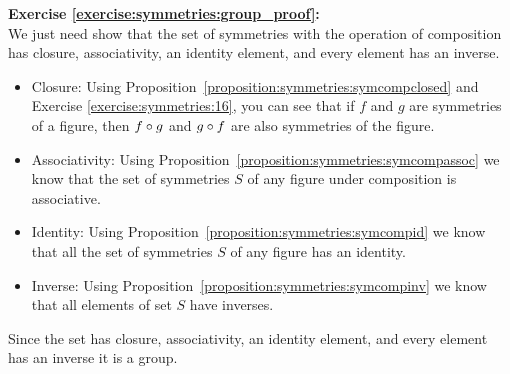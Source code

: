 \noindent\textbf{Exercise \ref{exercise:symmetries:group_proof}:}\\ 
We just need show that the set of symmetries with the operation of composition has closure, associativity, an identity element, and every element has an inverse.  
\begin{itemize}
\item
Closure: Using Proposition~\ref{proposition:symmetries:symcompclosed} and Exercise \ref{exercise:symmetries:16}, you can see that if $f$ and $g$ are symmetries of a figure, then $f \circ g$ and $g \circ f$ are also symmetries of the figure.

\item
Associativity: Using Proposition~\ref{proposition:symmetries:symcompassoc} we know that the set of symmetries $S$ of any figure under composition is associative.

\item
Identity: Using Proposition~\ref{proposition:symmetries:symcompid} we know that all the set of symmetries $S$ of any figure has an identity.

\item
Inverse: Using Proposition~\ref{proposition:symmetries:symcompinv} we know that all elements of set $S$ have inverses.
\end{itemize}
Since the set has closure, associativity, an identity element, and every element has an inverse it is a group.\\

